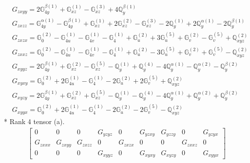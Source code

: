 \documentclass[fleqn,8pt,landscape]{jsarticle}
\begin{document}
\begin{align*}
& G_{zxyy} = 2 \mathbb{G}_{4y}^{\beta(1)} + \mathbb{G}_{xz}^{(1)} - \mathbb{G}_{xz}^{(3)} + 4 \mathbb{Q}_{y}^{\beta(1)} \\
& G_{zxzz} = \mathbb{G}_{4y}^{\alpha(1)} - \mathbb{G}_{4y}^{\beta(1)} + \mathbb{G}_{xz}^{(1)} + 2 \mathbb{G}_{xz}^{(2)} - \mathbb{G}_{xz}^{(3)} - 2 \mathbb{Q}_{y}^{(1)} + 2 \mathbb{Q}_{y}^{\alpha(1)} - 2 \mathbb{Q}_{y}^{\beta(1)} \\
& G_{zxzx} = \mathbb{G}_{0}^{(2)} - \mathbb{G}_{4u}^{(1)} - \mathbb{G}_{4v}^{(1)} - \mathbb{G}_{4}^{(1)} + \mathbb{G}_{u}^{(2)} + 3 \mathbb{G}_{u}^{(5)} + \mathbb{G}_{v}^{(2)} - \mathbb{G}_{v}^{(5)} + \mathbb{Q}_{xyz}^{(2)} \\
& G_{zxxz} = \mathbb{G}_{0}^{(2)} - \mathbb{G}_{4u}^{(1)} - \mathbb{G}_{4v}^{(1)} - \mathbb{G}_{4}^{(1)} + \mathbb{G}_{u}^{(2)} - 3 \mathbb{G}_{u}^{(5)} + \mathbb{G}_{v}^{(2)} + \mathbb{G}_{v}^{(5)} - \mathbb{Q}_{xyz}^{(2)} \\
& G_{xyyz} = 2 \mathbb{G}_{4y}^{\beta(1)} + \mathbb{G}_{xz}^{(2)} - \mathbb{G}_{xz}^{(5)} - \mathbb{Q}_{y}^{(1)} + \mathbb{Q}_{y}^{(4)} - 4 \mathbb{Q}_{y}^{\alpha(1)} - \mathbb{Q}_{y}^{\alpha(2)} - \mathbb{Q}_{y}^{\beta(2)} \\
& G_{xyxy} = \mathbb{G}_{0}^{(2)} + 2 \mathbb{G}_{4u}^{(1)} - \mathbb{G}_{4}^{(1)} - 2 \mathbb{G}_{u}^{(2)} + 2 \mathbb{G}_{v}^{(5)} + \mathbb{Q}_{xyz}^{(2)} \\
& G_{xyzy} = 2 \mathbb{G}_{4y}^{\beta(1)} + \mathbb{G}_{xz}^{(2)} + \mathbb{G}_{xz}^{(5)} - \mathbb{Q}_{y}^{(1)} - \mathbb{Q}_{y}^{(4)} - 4 \mathbb{Q}_{y}^{\alpha(1)} + \mathbb{Q}_{y}^{\alpha(2)} + \mathbb{Q}_{y}^{\beta(2)} \\
& G_{xyyx} = \mathbb{G}_{0}^{(2)} + 2 \mathbb{G}_{4u}^{(1)} - \mathbb{G}_{4}^{(1)} - 2 \mathbb{G}_{u}^{(2)} - 2 \mathbb{G}_{v}^{(5)} - \mathbb{Q}_{xyz}^{(2)}
\end{align*}
* Rank 4 tensor (a).
\begin{align*}
\begin{bmatrix} 0 & 0 & 0 & G_{yzyz} & 0 & G_{yzxy} & G_{yzzy} & 0 & G_{yzyx} \\ G_{zxxx} & G_{zxyy} & G_{zxzz} & 0 & G_{zxzx} & 0 & 0 & G_{zxxz} & 0 \\ 0 & 0 & 0 & G_{xyyz} & 0 & G_{xyxy} & G_{xyzy} & 0 & G_{xyyx} \end{bmatrix}
\end{align*}
\end{document}
